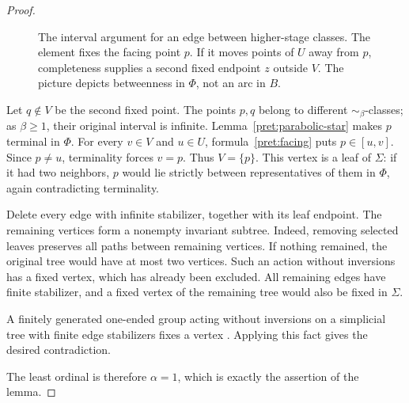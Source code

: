 \begin{proof}
\begin{figure}[!htbp]
\centering
{}
\caption{The interval argument for an edge between higher-stage classes.
The element fixes the facing point $p$.  If it moves points of $U$
away from $p$, completeness supplies a second fixed endpoint $z$ outside
$V$.  The picture depicts betweenness in $\Phi$, not an arc in $B$.}
\label{fig:pretree-endpoint}
\end{figure}

Let $q\notin V$ be the second fixed point.  The points $p,q$ belong
to different $\sim_\beta$-classes; as $\beta\ge1$, their original
interval is infinite.  Lemma~\ref{pret:parabolic-star} makes $p$ terminal
in $\Phi$.  For every $v\in V$ and $u\in U$, formula~\eqref{pret:facing}
puts $p\in[u,v]$.  Since $p\ne u$, terminality forces $v=p$.
Thus $V=\{p\}$.  This vertex is a leaf of $\Sigma$: if it had two
neighbors, $p$ would lie strictly between representatives of them in
$\Phi$, again contradicting terminality.

Delete every edge with infinite stabilizer, together with its leaf
endpoint.  The remaining vertices form a nonempty invariant subtree.
Indeed, removing selected leaves preserves all paths between remaining
vertices.  If nothing remained, the original tree would have at most
two vertices.  Such an action without inversions has a fixed vertex,
which has already been excluded.  All remaining edges have finite
stabilizer, and a fixed vertex of the remaining tree would also be fixed
in $\Sigma$.

A finitely generated one-ended group acting without inversions on a
simplicial tree with finite edge stabilizers fixes a vertex
\cite[Lemma~6.6]{Bowditch1999Treelike}.  Applying this fact gives the
desired contradiction.

The least ordinal is therefore $\alpha=1$, which is exactly the
assertion of the lemma.
\end{proof}

